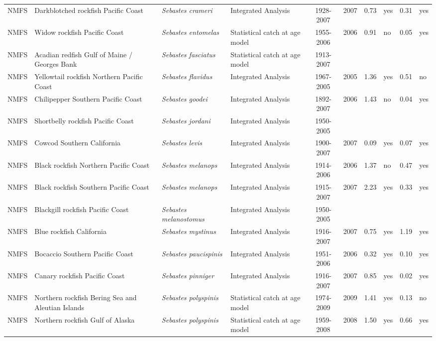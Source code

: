 \begin{longtable}{p{1.8cm}p{3.5cm}p{3.5cm}p{3cm}cccp{0.9cm}cp{0.9cm}}
  NMFS & Darkblotched rockfish Pacific Coast & \textit{Sebastes crameri} & Integrated Analysis & 1928-2007 & 2007 & 0.73 & yes & 0.31 & yes \\ 
  NMFS & Widow rockfish Pacific Coast & \textit{Sebastes entomelas} & Statistical catch at age model & 1955-2006 & 2006 & 0.91 & no & 0.05 & yes \\ 
  NMFS & Acadian redfish Gulf of Maine / Georges Bank & \textit{Sebastes fasciatus} & Statistical catch at age model & 1913-2007 &  &  &  &  &  \\ 
  NMFS & Yellowtail rockfish Northern Pacific Coast & \textit{Sebastes flavidus} & Integrated Analysis & 1967-2005 & 2005 & 1.36 & yes & 0.51 & no \\ 
  NMFS & Chilipepper Southern Pacific Coast & \textit{Sebastes goodei} & Integrated Analysis & 1892-2007 & 2006 & 1.43 & no & 0.04 & yes \\ 
  NMFS & Shortbelly rockfish Pacific Coast & \textit{Sebastes jordani} & Integrated Analysis & 1950-2005 &  &  &  &  &  \\ 
  NMFS & Cowcod Southern California & \textit{Sebastes levis} & Integrated Analysis & 1900-2007 & 2007 & 0.09 & yes & 0.07 & yes \\ 
  NMFS & Black rockfish Northern Pacific Coast & \textit{Sebastes melanops} & Integrated Analysis & 1914-2006 & 2006 & 1.37 & no & 0.47 & yes \\ 
  NMFS & Black rockfish Southern Pacific Coast & \textit{Sebastes melanops} & Integrated Analysis & 1915-2007 & 2007 & 2.23 & yes & 0.33 & yes \\ 
  NMFS & Blackgill rockfish  Pacific Coast & \textit{Sebastes melanostomus} & Integrated Analysis & 1950-2005 &  &  &  &  &  \\ 
  NMFS & Blue rockfish California & \textit{Sebastes mystinus} & Integrated Analysis & 1916-2007 & 2007 & 0.75 & yes & 1.19 & yes \\ 
  NMFS & Bocaccio Southern Pacific Coast & \textit{Sebastes paucispinis} & Integrated Analysis & 1951-2006 & 2006 & 0.32 & yes & 0.10 & yes \\ 
  NMFS & Canary rockfish Pacific Coast & \textit{Sebastes pinniger} & Integrated Analysis & 1916-2007 & 2007 & 0.85 & yes & 0.02 & yes \\ 
  NMFS & Northern rockfish Bering Sea and Aleutian Islands & \textit{Sebastes polyspinis} & Statistical catch at age model & 1974-2009 & 2009 & 1.41 & yes & 0.13 & no \\ 
  NMFS & Northern rockfish Gulf of Alaska & \textit{Sebastes polyspinis} & Statistical catch at age model & 1959-2008 & 2008 & 1.50 & yes & 0.66 & yes \\ 

\end{longtable}

